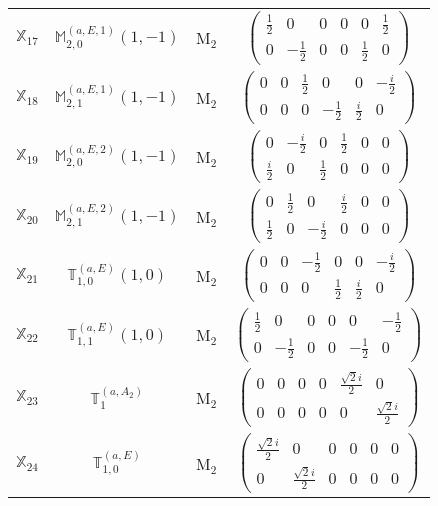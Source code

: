 \documentclass[fleqn,10pt,landscape]{article}
\begin{document}
\begin{itemize}
\begin{center}
\begin{longtable}{c|c|c|c}
$ \mathbb{X}_{17} $ & $\mathbb{M}_{2,0}^{(a,E,1)}(1,-1)$ & M$_{2}$ & $\begin{pmatrix} \frac{1}{2} & 0 & 0 & 0 & 0 & \frac{1}{2} \\ 0 & - \frac{1}{2} & 0 & 0 & \frac{1}{2} & 0 \end{pmatrix}$ \\
$ \mathbb{X}_{18} $ & $\mathbb{M}_{2,1}^{(a,E,1)}(1,-1)$ & M$_{2}$ & $\begin{pmatrix} 0 & 0 & \frac{1}{2} & 0 & 0 & - \frac{i}{2} \\ 0 & 0 & 0 & - \frac{1}{2} & \frac{i}{2} & 0 \end{pmatrix}$ \\
$ \mathbb{X}_{19} $ & $\mathbb{M}_{2,0}^{(a,E,2)}(1,-1)$ & M$_{2}$ & $\begin{pmatrix} 0 & - \frac{i}{2} & 0 & \frac{1}{2} & 0 & 0 \\ \frac{i}{2} & 0 & \frac{1}{2} & 0 & 0 & 0 \end{pmatrix}$ \\
$ \mathbb{X}_{20} $ & $\mathbb{M}_{2,1}^{(a,E,2)}(1,-1)$ & M$_{2}$ & $\begin{pmatrix} 0 & \frac{1}{2} & 0 & \frac{i}{2} & 0 & 0 \\ \frac{1}{2} & 0 & - \frac{i}{2} & 0 & 0 & 0 \end{pmatrix}$ \\
$ \mathbb{X}_{21} $ & $\mathbb{T}_{1,0}^{(a,E)}(1,0)$ & M$_{2}$ & $\begin{pmatrix} 0 & 0 & - \frac{1}{2} & 0 & 0 & - \frac{i}{2} \\ 0 & 0 & 0 & \frac{1}{2} & \frac{i}{2} & 0 \end{pmatrix}$ \\
$ \mathbb{X}_{22} $ & $\mathbb{T}_{1,1}^{(a,E)}(1,0)$ & M$_{2}$ & $\begin{pmatrix} \frac{1}{2} & 0 & 0 & 0 & 0 & - \frac{1}{2} \\ 0 & - \frac{1}{2} & 0 & 0 & - \frac{1}{2} & 0 \end{pmatrix}$ \\
$ \mathbb{X}_{23} $ & $\mathbb{T}_{1}^{(a,A_{2})}$ & M$_{2}$ & $\begin{pmatrix} 0 & 0 & 0 & 0 & \frac{\sqrt{2} i}{2} & 0 \\ 0 & 0 & 0 & 0 & 0 & \frac{\sqrt{2} i}{2} \end{pmatrix}$ \\
$ \mathbb{X}_{24} $ & $\mathbb{T}_{1,0}^{(a,E)}$ & M$_{2}$ & $\begin{pmatrix} \frac{\sqrt{2} i}{2} & 0 & 0 & 0 & 0 & 0 \\ 0 & \frac{\sqrt{2} i}{2} & 0 & 0 & 0 & 0 \end{pmatrix}$ \\

\end{longtable}
\end{center}
\end{itemize}
\end{document}
